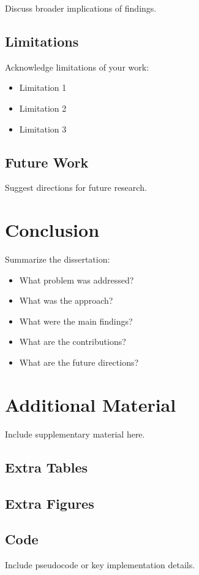 \documentclass[12pt]{report}
\theoremstyle{dissertation}
\newtheorem theorem}{Theorem}
\newtheorem definition}{Definition}
\newtheorem lemma}{Lemma}
\newtheorem proposition}{Proposition}
\newtheorem corollary}{Corollary}
\begin{document}
Discuss broader implications of findings.

\section{Limitations}

Acknowledge limitations of your work:

\begin{itemize}
  \item Limitation 1
  \item Limitation 2
  \item Limitation 3
\end{itemize}

\section{Future Work}

Suggest directions for future research.

\chapter{Conclusion}
\label{chapter:conclusion}

Summarize the dissertation:

\begin{itemize}
  \item What problem was addressed?
  \item What was the approach?
  \item What were the main findings?
  \item What are the contributions?
  \item What are the future directions?
\end{itemize}




\appendix

\chapter{Additional Material}

Include supplementary material here.

\section{Extra Tables}

\section{Extra Figures}

\section{Code}

Include pseudocode or key implementation details.
\end{document}
